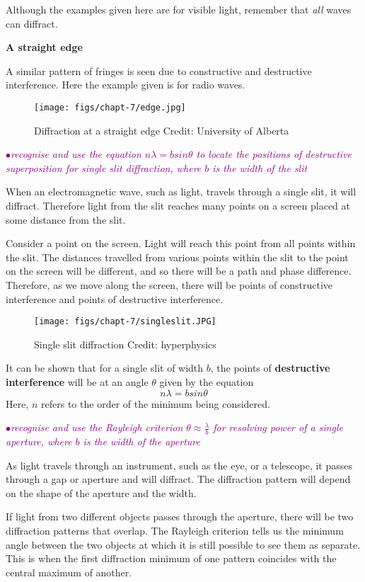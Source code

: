 \documentclass[a4paper,11pt,twoside]{memoir}
\newcounter{spec}[chapter]
\newcommand{\spec}[1]{\Needspace{5\baselineskip}\textcolor{purple}{$\bullet$\hspace{0.5cm}\textit{#1}}}
\begin{document}
Although the examples given here are for visible light, remember that \emph{all} waves can diffract.

\textbf{A straight edge}

A similar pattern of fringes is seen due to constructive and destructive interference. Here the example given is for radio waves.

\begin{figure}[h!]
\centering
\texttt{[image: figs/chapt-7/edge.jpg]}
\caption{Diffraction at a straight edge {Credit: University of Alberta}}
\end{figure}

\spec{recognise and use the equation $n\lambda = b sin\theta$ to locate the positions of destructive superposition for single slit diffraction, where $b$ is the width of the slit}

When an electromagnetic wave, such as light, travels through a single slit, it will diffract. Therefore light from the slit reaches many points on a screen placed at some distance from the slit.

Consider a point on the screen. Light will reach this point from all points within the slit. The distances travelled from various points within the slit to the point on the screen will be different, and so there will be a path and phase difference. Therefore, as we move along the screen, there will be points of constructive interference and points of destructive interference.

\begin{figure}[h!]
\centering
\texttt{[image: figs/chapt-7/singleslit.JPG]}
\caption{Single slit diffraction {Credit: hyperphysics}}
\end{figure}

It can be shown that for a single slit of width $b$, the points of \textbf{destructive interference} will be at an angle $\theta$ given by the equation
$$n\lambda = b sin\theta$$
Here, $n$ refers to the order of the minimum being considered.

\spec{recognise and use the Rayleigh criterion $\theta \approx \frac{\lambda}{b}$ for resolving power of a single aperture, where $b$ is the width of the aperture}

As light travels through an instrument, such as the eye, or a telescope, it passes through a gap or aperture and will diffract. The diffraction pattern will depend on the shape of the aperture and the width.

If light from two different objects passes through the aperture, there will be two diffraction patterns that overlap. The Rayleigh criterion tells us the minimum angle between the two objects at which it is still possible to see them as separate. This is when the first diffraction minimum of one pattern coincides with the central maximum of another.
\end{document}
